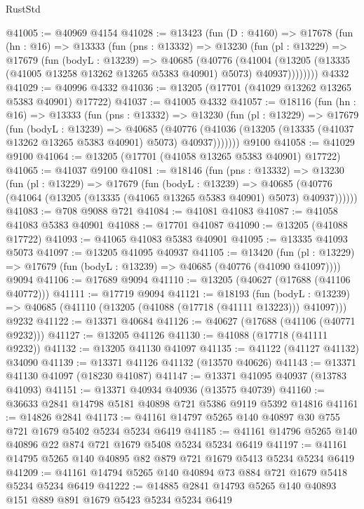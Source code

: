 \begin{lexlean}{RustStd}
\begin{coremodule}
@41005 := @40969 @4154
@41028 := @13423
    (fun (D : @4160) =>
    @17678
      (fun (hn : @16) =>
      @13333
        (fun (pns : @13332) =>
        @13230
          (fun (pl : @13229) =>
          @17679
            (fun (bodyL : @13239) =>
            @40685
              (@40776
                (@41004
                  (@13205 (@13335 (@41005 @13258 @13262 @13265 @5383 @40901) @5073) @40937))))))))
    @4332
@41029 := @40996 @4332
@41036 := @13205 (@17701 (@41029 @13262 @13265 @5383 @40901) @17722)
@41037 := @41005 @4332
@41057 := @18116
    (fun (hn : @16) =>
    @13333
      (fun (pns : @13332) =>
      @13230
        (fun (pl : @13229) =>
        @17679
          (fun (bodyL : @13239) =>
          @40685
            (@40776 (@41036 (@13205 (@13335 (@41037 @13262 @13265 @5383 @40901) @5073) @40937)))))))
    @9100
@41058 := @41029 @9100
@41064 := @13205 (@17701 (@41058 @13265 @5383 @40901) @17722)
@41065 := @41037 @9100
@41081 := @18146
    (fun (pns : @13332) =>
    @13230
      (fun (pl : @13229) =>
      @17679
        (fun (bodyL : @13239) =>
        @40685 (@40776 (@41064 (@13205 (@13335 (@41065 @13265 @5383 @40901) @5073) @40937))))))
@41083 := @708 @9088 @721
@41084 := @41081 @41083
@41087 := @41058 @41083 @5383 @40901
@41088 := @17701 @41087
@41090 := @13205 (@41088 @17722)
@41093 := @41065 @41083 @5383 @40901
@41095 := @13335 @41093 @5073
@41097 := @13205 @41095 @40937
@41105 := @13420
    (fun (pl : @13229) => @17679 (fun (bodyL : @13239) => @40685 (@40776 (@41090 @41097))))
    @9094
@41106 := @17689 @9094
@41110 := @13205 (@40627 (@17688 (@41106 @40772)))
@41111 := @17719 @9094
@41121 := @18193
    (fun (bodyL : @13239) => @40685 (@41110 (@13205 (@41088 (@17718 (@41111 @13223))) @41097)))
    @9232
@41122 := @13371 @40684
@41126 := @40627 (@17688 (@41106 (@40771 @9232)))
@41127 := @13205 @41126
@41130 := @41088 (@17718 (@41111 @9232))
@41132 := @13205 @41130 @41097
@41135 := @41122 (@41127 @41132) @34090
@41139 := @13371 @41126 @41132 (@13570 @40626)
@41143 := @13371 @41130 @41097 (@18230 @41087)
@41147 := @13371 @41095 @40937 (@13783 @41093)
@41151 := @13371 @40934 @40936 (@13575 @40739)
@41160 := @36633 @2841 @14798 @5181 @40898 @721 @5386 @9119 @5392 @14816
@41161 := @14826 @2841
@41173 := @41161 @14797 @5265 @140 @40897 @30 @755 @721 @1679 @5402 @5234 @5234 @6419
@41185 := @41161 @14796 @5265 @140 @40896 @22 @874 @721 @1679 @5408 @5234 @5234 @6419
@41197 := @41161 @14795 @5265 @140 @40895 @82 @879 @721 @1679 @5413 @5234 @5234 @6419
@41209 := @41161 @14794 @5265 @140 @40894 @73 @884 @721 @1679 @5418 @5234 @5234 @6419
@41222 := @14885 @2841 @14793 @5265 @140 @40893 @151 @889 @891 @1679 @5423 @5234 @5234 @6419

\end{coremodule}
\end{lexlean}
